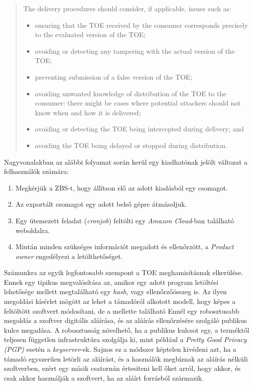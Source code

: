 \begin{quote}
    The delivery procedures should consider, if applicable, issues such as:
    \begin{itemize}
        \item ensuring that the TOE received by the consumer corresponds precisely to the evaluated
            version of the TOE;
        \item avoiding or detecting any tampering with the actual version of the TOE;
        \item preventing submission of a false version of the TOE;
        \item avoiding unwanted knowledge of distribution of the TOE to the consumer: there might be
            cases where potential attackers should not know when and how it is delivered;
        \item avoiding or detecting the TOE being intercepted during delivery; and
        \item avoiding the TOE being delayed or stopped during distribution.
    \end{itemize}
\end{quote}

Nagyvonalakban az alábbi folyamat során kerül egy kiadhatónak jelölt változat a felhasználók
számára:
\begin{enumerate}
    \item Megkérjük a ZBS-t, hogy állítson elő az adott kiadásból egy csomagot.
    \item Az exportált csomagot egy adott belső gépre átmásoljuk.
    \item Egy ütemezett feladat (\emph{cronjob}) feltölti egy \emph{Amazon Cloud}-ban található
        weboldalra.
    \item Miután minden szükséges információt megadott és ellenőrzött, a \emph{Product owner}
        engedélyezi a letölthetőséget.
\end{enumerate}

Számunkra az egyik legfontosabb szempont a TOE meghamisításnak elkerülése. Ennek egy tipikus
megvalósítása az, amikor egy adott program letöltési lehetősége mellett megtalálható egy
\emph{hash}, vagy ellenőrzőösszeg is. Az ilyen megoldási kísérlet mögött az lehet a támadóról
alkotott modell, hogy képes a feltöltött szoftvert módosítani, de a mellette található Ennél egy
robosztusabb megoldás a szoftver digitális aláírása, és az aláírás ellenőrzésére szolgáló publikus
kulcs megadása.  A robosztusság növelhető, ha a publikus kulcsot egy, a terméktől teljesen független
infrastruktúra szolgálja ki, mint például a \emph{Pretty Good Privacy (PGP)} esetén
a \emph{keyserver}-ek.  Sajnos ez a módszer képtelen kivédeni azt, ha a támadó egyszerűen letörli az
aláírást, és a használók megbíznak az aláírás nélküli szoftverben, ezért egy másik csatornán
értesíteni kell őket arról, hogy akkor, és csak akkor használják a szoftvert, ha az aláírt forrásból
származik.

